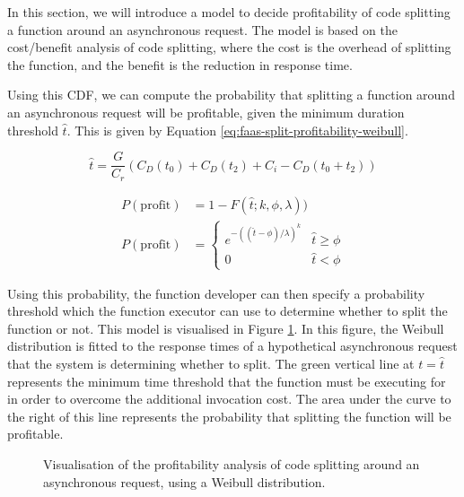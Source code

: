 In this section, we will introduce a model to decide profitability of code splitting a function around an asynchronous request. The model is based on the cost/benefit analysis of code splitting, where the cost is the overhead of splitting the function, and the benefit is the reduction in response time.

Using this CDF, we can compute the probability that splitting a function around an asynchronous request will be profitable, given the minimum duration threshold $\hat{t}$. This is given by Equation \ref{eq:faas-split-profitability-weibull}.

\begin{equation}
\hat{t} = \frac{G}{C_r} \left( C_D(t_0) + C_D(t_2) + C_i - C_D(t_0 + t_2) \right)
\end{equation}

\begin{equation} \label{eq:faas-split-profitability-weibull}
\begin{aligned}
P(\mathrm{profit}) & = 1 - F(\hat{t}; k, \phi, \lambda)) \\
P(\mathrm{profit}) & =
    \begin{cases}
    e^{-((\hat{t} - \phi)/\lambda)^k} & \hat{t} \geq \phi \\
    0 & \hat{t} < \phi
    \end{cases}
\end{aligned}
\end{equation}

Using this probability, the function developer can then specify a probability threshold which the function executor can use to determine whether to split the function or not. This model is visualised in Figure \ref{fig:splitting-profitability-analysis-weibull-fit}. In this figure, the Weibull distribution is fitted to the response times of a hypothetical asynchronous request that the system is determining whether to split. The green vertical line at $t = \hat{t}$ represents the minimum time threshold that the function must be executing for in order to overcome the additional invocation cost. The area under the curve to the right of this line represents the probability that splitting the function will be profitable.

\begin{figure}
    \begin{center}
        
    \end{center}
    \caption{Visualisation of the profitability analysis of code splitting around an asynchronous request, using a Weibull distribution.}
    \label{fig:splitting-profitability-analysis-weibull-fit}
\end{figure}

